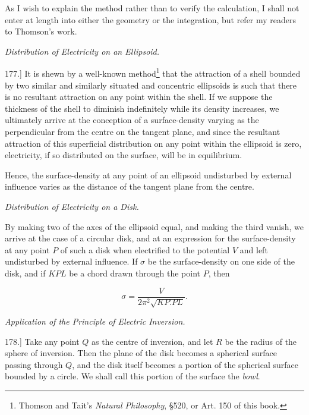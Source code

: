 \documentclass[11pt,a4paper]{article}
\begin{document}
As I wish to explain the method rather than to verify the calculation, I shall not enter at length into either the geometry or the integration, but refer my readers to Thomson's work.

\begin{center}
\textit{Distribution of Electricity on an Ellipsoid.}
\end{center}

177.] It is shewn by a well-known method\footnote{Thomson and Tait's \textit{Natural Philosophy}, \S 520, or Art. 150 of this book.} that the attraction of a shell bounded by two similar and similarly situated and concentric ellipsoids is such that there is no resultant attraction on any point within the shell. If we suppose the thickness of the shell to diminish indefinitely while its density increases, we ultimately arrive at the conception of a surface-density varying as the perpendicular from the centre on the tangent plane, and since the resultant attraction of this superficial distribution on any point within the ellipsoid is zero, electricity, if so distributed on the surface, will be in equilibrium.

Hence, the surface-density at any point of an ellipsoid undisturbed by external influence varies as the distance of the tangent plane from the centre.

\begin{center}
\textit{Distribution of Electricity on a Disk.}
\end{center}

By making two of the axes of the ellipsoid equal, and making the third vanish, we arrive at the case of a circular disk, and at an expression for the surface-density at any point $P$ of such a disk when electrified to the potential $V$ and left undisturbed by external influence. If $\sigma$ be the surface-density on one side of the disk, and if $KPL$ be a chord drawn through the point $P$, then

\[
\sigma = \frac{V}{2\pi^2\sqrt{KP.PL}}.
\]

\begin{center}
\textit{Application of the Principle of Electric Inversion.}
\end{center}

178.] Take any point $Q$ as the centre of inversion, and let $R$ be the radius of the sphere of inversion. Then the plane of the disk becomes a spherical surface passing through $Q$, and the disk itself becomes a portion of the spherical surface bounded by a circle. We shall call this portion of the surface the \textit{bowl}.
\end{document}
